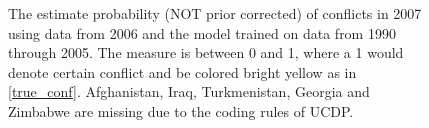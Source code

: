 \documentclass[a4paper]{article}
\begin{document}
\begin{figure}[!htb]
\begin{minipage}[b]{1\textwidth}
    \caption{\footnotesize{The estimate probability (NOT prior corrected) of conflicts in 2007 using data from 2006 and the model trained on data from 1990 through 2005. The measure is between 0 and 1, where a 1 would denote certain conflict and be colored bright yellow as in \autoref{true_conf}. Afghanistan, Iraq, Turkmenistan, Georgia and Zimbabwe are missing due to the coding rules of UCDP.}}\label{pred_conf2}
  \end{minipage}
\end{figure}
\end{document}
